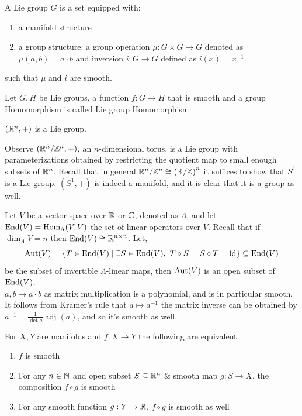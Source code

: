 \begin{definition}
	A Lie group $G$ is a set equipped with:
	\begin{enumerate}
		\item a manifold structure
		\item a group structure:
			a group operation $\mu : G \times G \to G$ denoted as $\mu(a, b) = a \cdot b$ and inversion $i : G \to G$ defined as $i(x) = x^{-1}$.
	\end{enumerate}
	such that $\mu$ and $i$ are smooth.
\end{definition}
\begin{definition}
	Let $G, H$ be Lie groups, a function $f : G \to H$ that is smooth and a group Homomorphism is called Lie group Homomorphism.
\end{definition}
\begin{example}
	$(\mathbb{R}^n, +)$ is a Lie group.
\end{example}
\begin{example}
	Observe $(\mathbb{R}^n / \mathbb{Z}^n, +)$, an $n$-dimensional torus, is a Lie group with parameterizations obtained by restricting the quotient map to small enough subsets of $\mathbb{R}^n$.
	Recall that in general $\mathbb{R}^n / \mathbb{Z}^n \cong {(\mathbb{R}/ \mathbb{Z})}^n$ it suffices to show that $S^1$ is a Lie group.
	$(S^1, +)$ is indeed a manifold, and it is clear that it is a group as well.
\end{example}
\begin{example}
	Let $V$ be a vector-space over $\mathbb{R}$ or $\mathbb{C}$, denoted as $\Lambda$, and let $\operatorname{End}(V) = \operatorname{Hom}_{\Lambda}(V, V)$ the set of linear operators over $V$.
	Recall that if $\dim_{\Lambda} V = n$ then $\operatorname{End}(V) \cong \mathbb{R}^{n \times n}$.
	Let,
	\[
		\operatorname{Aut}(V)
		= \{ T \in \operatorname{End}(V) \mid \exists S \in \operatorname{End}(V),\ T \circ S = S \circ T = \operatorname{id} \}
		\subseteq \operatorname{End}(V)
	\]
	be the subset of invertible $\Lambda$-linear maps, then $\operatorname{Aut}(V)$ is an open subset of $\operatorname{End}(V)$. \\
	$a, b \mapsto a \cdot b$ as matrix multiplication is a polynomial, and is in particular smooth.
	It follows from Kramer's rule that $a \mapsto a^{-1}$ the matrix inverse can be obtained by $a^{-1} = \frac{1}{\det a} \operatorname{adj}(a)$, and so it's smooth as well.
\end{example}
\begin{remark}
	For $X, Y$ are manifolds and $f : X \to Y$ the following are equivalent:
	\begin{enumerate}
		\item $f$ is smooth
		\item For any $n \in \mathbb{N}$ and open subset $S \subseteq \mathbb{R}^n$ \& smooth map $g : S \to X$, the composition $f \circ g$ is smooth
		\item For any smooth function $g : Y \to \mathbb{R}$, $f \circ g$ is smooth as well
	\end{enumerate}
\end{remark}
